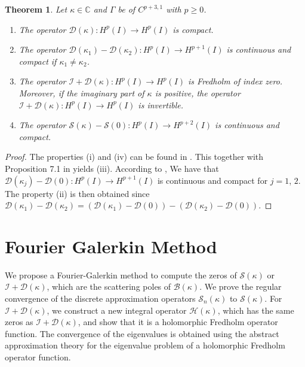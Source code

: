 \documentclass{article}
\newtheorem{theorem}{Theorem}[section]
\begin{document}
	\begin{theorem}\label{thm:Sec2}
		Let $\kappa \in \mathbb C$ and $\Gamma$ be of $C^{p+3,1}$ with $p\geq 0$. 
		\begin{enumerate}
			\item[\rm (i)] The operator $\mathcal{D}(\kappa): H^{p}(I)\to H^{p}(I)$ is compact.
			\item[\rm(ii)] The operator $\mathcal{D}(\kappa_1)-\mathcal{D}(\kappa_2): H^{p}(I)\to H^{p+1}(I) $ is continuous and compact if $\kappa_1\neq\kappa_2$.
			\item[\rm(iii)] The operator $\mathcal{I}+\mathcal{D}(\kappa): H^{p}(I)\to H^{p}(I) $ is Fredholm of index zero. Moreover, if the imaginary part of $\kappa$ is positive, the operator $\mathcal{I}+\mathcal{D}(\kappa): H^{p}(I)\to H^{p}(I) $ is invertible.
			\item[\rm(iv)] The operator $\mathcal{S}(\kappa)-\mathcal{S}(0): H^{p}(I)\to H^{p+2}(I) $ is continuous and compact.
		\end{enumerate}
	\end{theorem}
\begin{proof}
	The properties (i) and (iv) can be found in \cite{Kirsch1989}. This together with Proposition 7.1 in \cite{Taylor1996} yields (iii). According to \cite{Kirsch1989}, We have that $\mathcal{D}(\kappa_j)-\mathcal{D}(0): H^{p}(I)\to H^{p+1}(I) $ is continuous and compact for $j=1$, $2$. The property (ii) is then obtained since $\mathcal{D}(\kappa_1)-\mathcal{D}(\kappa_2)=(\mathcal{D}(\kappa_1)-\mathcal{D}(0))-(\mathcal{D}(\kappa_2)-\mathcal{D}(0))$.
\end{proof}
	
	
	\section{Fourier Galerkin Method}
	We propose a Fourier-Galerkin method to compute the zeros of $\mathcal{S}(\kappa)$ or  $\mathcal{I}+\mathcal{D}(\kappa)$, which are the scattering poles of ${\mathcal B}(\kappa)$. 
	We prove the regular convergence of the discrete approximation operators $\mathcal{S}_n(\kappa)$ to $\mathcal{S}(\kappa)$.
   For  $\mathcal{I}+\mathcal{D}(\kappa)$, we  construct a new integral operator $\mathcal{H}(\kappa)$, which has the same zeros as $\mathcal{I}+\mathcal{D}(\kappa)$, and show that it is a holomorphic Fredholm operator function.  The convergence of the eigenvalues is obtained using the abstract approximation theory for the eigenvalue problem of a holomorphic Fredholm operator function. 
	
\end{document}
